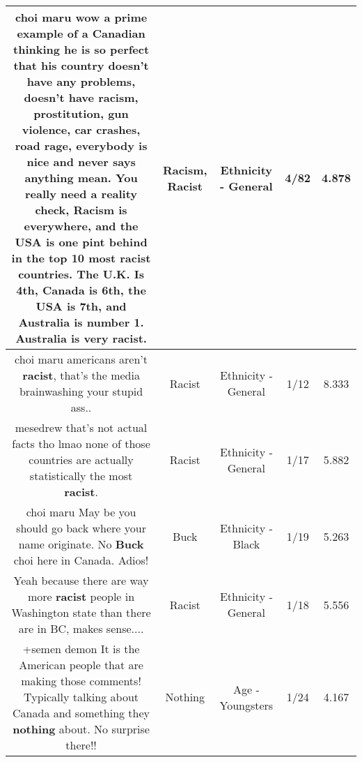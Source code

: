 \documentclass[11pt]{article}
\newlength\mylength
\begin{document}
\begin{center}
\begin{longtable}{|C{.65\mylength}|C{.30\mylength}|C{.12\mylength}|C{.12\mylength}|C{.12\mylength}|}
  \small choi maru wow a prime example of a Canadian thinking he is so perfect that his country doesn't have any problems, doesn't have \textbf{racism}, prostitution, gun violence, car crashes, road rage, everybody is nice and never says anything mean. You really need a reality check, \textbf{Racism} is everywhere, and the USA is one pint behind in the top 10 most \textbf{racist} countries. The U.K. Is 4th, Canada is 6th, the USA is 7th, and Australia is number 1. Australia is very \textbf{racist}.\normalsize   & Racism, Racist & Ethnicity - General & 4/82 & 4.878 \\  \hline
  \small choi maru americans aren't \textbf{racist}, that's the media brainwashing your stupid ass..\normalsize   & Racist & Ethnicity - General & 1/12 & 8.333 \\  \hline
  \small mesedrew that's not actual facts tho lmao none of those countries are actually statistically the most \textbf{racist}.\normalsize   & Racist & Ethnicity - General & 1/17 & 5.882 \\  \hline
  \small choi maru  May be you should go back where your name originate. No \textbf{Buck} choi here in Canada. Adios!\normalsize   & Buck & Ethnicity - Black & 1/19 & 5.263 \\  \hline
  \small Yeah because there are way more \textbf{racist} people in Washington state than there are in BC, makes sense....\normalsize   & Racist & Ethnicity - General & 1/18 & 5.556 \\  \hline
  \small +semen demon It is the American people that are making those comments! Typically talking about Canada and something they \textbf{nothing} about. No surprise there!!\normalsize   & Nothing & Age - Youngsters & 1/24 & 4.167 \\  \hline

\end{longtable}
\end{center}
\end{document}
